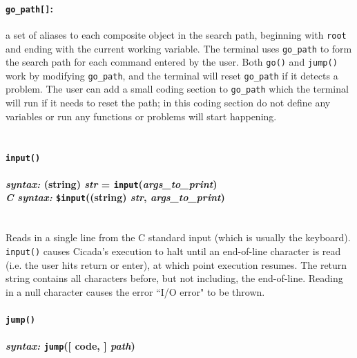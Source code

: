 \documentclass{article}
\begin{document}
\paragraph{\texttt{go\_path[]}:}  a set of aliases to each composite object in the search path, beginning with \verb#root# and ending with the current working variable.  The terminal uses \verb#go_path# to form the search path for each command entered by the user.  Both \verb#go()# and \verb#jump()# work by modifying \verb#go_path#, and the terminal will reset \verb#go_path# if it detects a problem.  The user can add a small coding section to \verb#go_path# which the terminal will run if it needs to reset the path; in this coding section do not define any variables or run any functions or problems will start happening.\\\\





\paragraph{\texttt{input()}\\\\
\normalfont \emph{syntax: } (string) \emph{str} = \texttt{input}(\emph{args\_to\_print})\\
\normalfont \emph{C syntax: } \texttt{\$input}((string) \emph{str}, \emph{args\_to\_print})\\\\}

Reads in a single line from the C standard input (which is usually the keyboard).  \texttt{input()} causes Cicada's execution to halt until an end-of-line character is read (i.e. the user hits return or enter), at which point execution resumes.  The return string contains all characters before, but not including, the end-of-line.  Reading in a null character causes the error ``I/O error" to be thrown.\\






\paragraph{\texttt{jump()}\\\\
\normalfont \emph{syntax: } \texttt{jump}([ code, ] \emph{path})\\\\}
\end{document}
